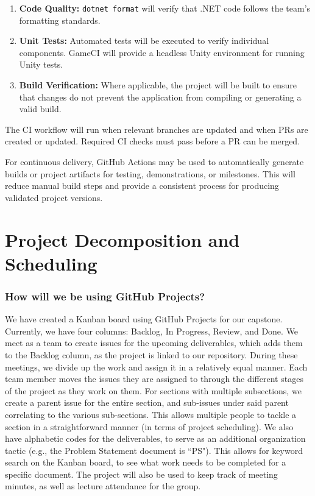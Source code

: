 \documentclass{article}
\begin{document}
\begin{enumerate}
    \item \textbf{Code Quality:}
    \texttt{dotnet format} will verify that .NET code follows the team's
    formatting standards.

    \item \textbf{Unit Tests:}
    Automated tests will be executed to verify individual components.
    GameCI will provide a headless Unity environment for running Unity tests.

    \item \textbf{Build Verification:}
    Where applicable, the project will be built to ensure that changes do not
    prevent the application from compiling or generating a valid build.
\end{enumerate}

The CI workflow will run when relevant branches are updated and when PRs
are created or updated. Required CI checks must pass before a PR can be
merged.

For continuous delivery, GitHub Actions may be used to automatically
generate builds or project artifacts for testing, demonstrations, or
milestones. This will reduce manual build steps and provide a consistent
process for producing validated project versions.

\section{Project Decomposition and Scheduling}

\subsubsection*{How will we be using GitHub Projects?} 

We have created a Kanban board using GitHub Projects for our capstone. Currently, we have four columns: Backlog,
In Progress, Review, and Done. We meet as a team to create issues for the upcoming deliverables, which adds them to the
Backlog column, as the project is linked to our repository. During these meetings, we divide up the work and assign it in a
relatively equal manner. Each team member moves the issues they are assigned to through the different stages of the project
as they work on them. For sections with multiple subsections, we create a parent issue for the entire section, and sub-issues
under said parent correlating to the various sub-sections. This allows multiple people to tackle a section in a straightforward
manner (in terms of project scheduling). We also have alphabetic codes for the deliverables, to serve as an additional organization tactic
(e.g., the Problem Statement document is ``PS"). This allows for keyword search on the Kanban board, to see what work needs to
be completed for a specific document. The project will also be used to keep track of meeting minutes, as well as lecture attendance for the group.
\end{document}
